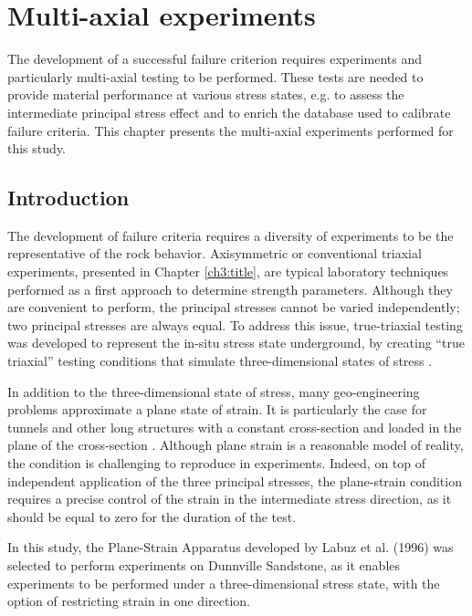 \chapter{Multi-axial experiments}\label{ch4:title}

The development of a successful failure criterion requires experiments and particularly multi-axial testing \cite{Labuz2018} to be performed. These tests are needed to provide material performance at various stress states, e.g. to assess the intermediate principal stress effect and to enrich the database used to calibrate failure criteria. This chapter presents the multi-axial experiments performed for this study. 


\section{Introduction}

The development of failure criteria requires a diversity of experiments to be the representative of the rock behavior. Axisymmetric or conventional triaxial experiments, presented in Chapter \ref{ch3:title}, are typical laboratory techniques performed as a first approach to determine strength parameters. Although they are convenient to perform, the principal stresses cannot be varied independently; two principal stresses are always equal. To address this issue, true-triaxial testing was developed to represent the in-situ stress state underground, by creating “true triaxial” testing conditions that simulate three-dimensional states of stress \cite{Labuz2018} .

In addition to the three-dimensional state of stress, many geo-engineering problems approximate a plane state of strain. It is particularly the case for tunnels and other long structures with a constant cross-section and loaded in the plane of the cross-section \cite{Jaeger1979}. Although plane strain is a reasonable model of reality, the condition is challenging to reproduce in experiments. Indeed, on top of independent application of the three principal stresses, the plane-strain condition requires a precise control of the strain in the intermediate stress direction, as it should be equal to zero for the duration of the test. 

In this study, the Plane-Strain Apparatus developed by Labuz et al. (1996) \cite{Labuz1996} was selected to perform experiments on Dunnville Sandstone, as it enables experiments to be performed under a three-dimensional stress state, with the option of restricting strain in one direction.

